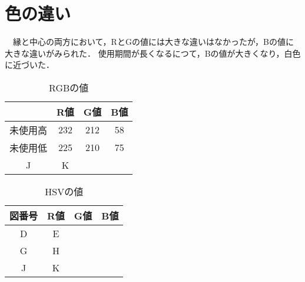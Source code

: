 \documentclass[main]{subfiles}
\begin{document}
\section{色の違い}

　縁と中心の両方において，RとGの値には大きな違いはなかったが，Bの値に大きな違いがみられた．
使用期間が長くなるにつて，Bの値が大きくなり，白色に近づいた．


\begin{table}[h]
    \caption{RGBの値}
    \label{table:SpeedOfLight}
    \centering
\begin{tabular}{|c|c|c|c|}
   \hline
    & R値 & G値 & B値 \\ \hline
   未使用高 & 232 & 212 & 58 \\ \hline
   未使用低 & 225 & 210 & 75 \\ \cline{2-3}
   J & K & & \\ \hline
\end{tabular}    
\end{table}

\begin{table}[h]
    \caption{HSVの値}
    \label{table:SpeedOfLight}
    \centering
\begin{tabular}{|c|c|c|c|}
   \hline
   図番号 & R値 & G値 & B値 \\ \hline
   D & E & & \\ \hline
   G & H & & \\ \hline
   J & K & & \\ \hline
\end{tabular}    
\end{table}
\end{document}

